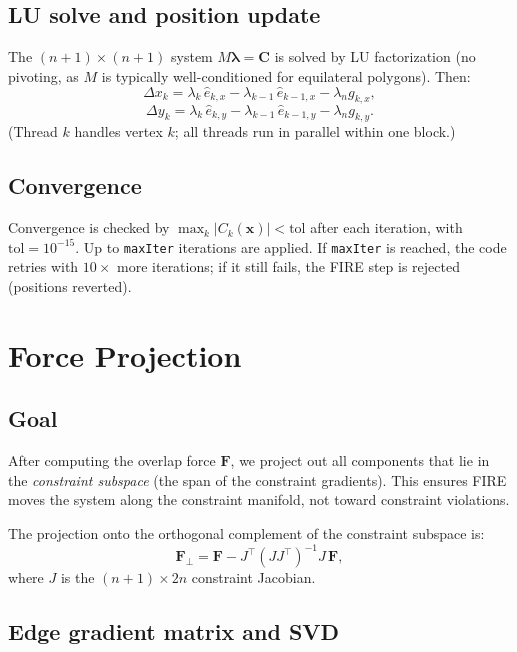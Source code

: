 \documentclass[12pt]{article}
\begin{document}
\subsection{LU solve and position update}

The $(n+1)\times(n+1)$ system $M\boldsymbol{\lambda} = \mathbf{C}$ is solved by LU factorization
(no pivoting, as $M$ is typically well-conditioned for equilateral polygons).  Then:
\[
  \Delta x_k = \lambda_k\,\hat e_{k,x} - \lambda_{k-1}\,\hat e_{k-1,x} - \lambda_n g_{k,x},
\]
\[
  \Delta y_k = \lambda_k\,\hat e_{k,y} - \lambda_{k-1}\,\hat e_{k-1,y} - \lambda_n g_{k,y}.
\]
(Thread $k$ handles vertex $k$; all threads run in parallel within one block.)

\subsection{Convergence}

Convergence is checked by $\max_k |C_k(\mathbf{x})| < \mathrm{tol}$ after each
iteration, with $\mathrm{tol} = 10^{-15}$.  Up to \texttt{maxIter} iterations are
applied.  If \texttt{maxIter} is reached, the code retries with $10\times$ more
iterations; if it still fails, the FIRE step is rejected (positions reverted).

\section{Force Projection}

\subsection{Goal}

After computing the overlap force $\mathbf{F}$, we project out all components that
lie in the \emph{constraint subspace} (the span of the constraint gradients).  This
ensures FIRE moves the system along the constraint manifold, not toward constraint
violations.

The projection onto the orthogonal complement of the constraint subspace is:
\[
  \mathbf{F}_\perp = \mathbf{F} - J^\top (J J^\top)^{-1} J\, \mathbf{F},
\]
where $J$ is the $(n+1)\times 2n$ constraint Jacobian.

\subsection{Edge gradient matrix and SVD}
\end{document}
